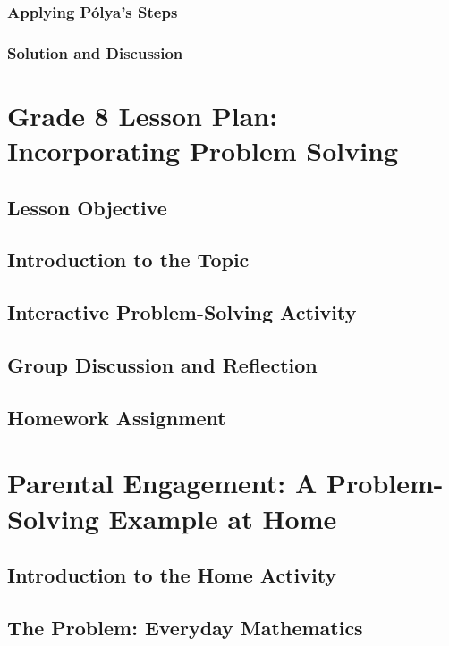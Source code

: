 \documentclass{book}
\begin{document}
\subsubsection{Applying Pólya's Steps}
\subsubsection{Solution and Discussion}


\section{Grade 8 Lesson Plan: Incorporating Problem Solving}
\subsection{Lesson Objective}
\subsection{Introduction to the Topic}
\subsection{Interactive Problem-Solving Activity}
\subsection{Group Discussion and Reflection}
\subsection{Homework Assignment}


\section{Parental Engagement: A Problem-Solving Example at Home}
\subsection{Introduction to the Home Activity}
\subsection{The Problem: Everyday Mathematics}
\end{document}
